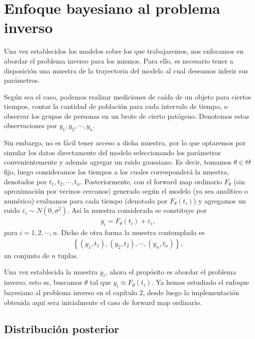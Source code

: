 \section{Enfoque bayesiano al problema inverso}

Una vez establecidos los modelos sobre los que trabajaremos, nos enfocamos en abordar el problema inverso para los mismos. Para ello, es necesario tener a disposición una muestra de la trayectoria del modelo al cual deseamos inferir sus parámetros.

Según sea el caso, podemos realizar mediciones de caída de un objeto para ciertos tiempos, contar la cantidad de población para cada intervalo de tiempo, o observar los grupos de personas en un brote de cierto patógeno. Denotemos estas observaciones por $y_1, y_2, \cdots, y_n$. 

Sin embargo, no es fácil tener acceso a dicha muestra, por lo que optaremos por simular los datos directamente del modelo seleccionando los parámetros convenientemente y además agregar un ruido gaussiano. Es decir, tomamos $\theta \in \Theta$ fijo, luego consideramos los tiempos a los cuales corresponderá la muestra, denotados por $t_1, t_2, \cdots, t_n$. Posteriormente, con el forward map ordinario $F_{\theta}$ (sin aproximación por vecinos cercanos) generado según el modelo (ya sea analítico o numérico) evaluamos para cada tiempo (denotado por $F_{\theta}(t_i)$) y agregamos un ruido $\varepsilon_i \sim N(0,\sigma^2)$. Así la muestra considerada se constituye por
\begin{align}
    y_i = F_{\theta}(t_i) + \varepsilon_i,%
    \label{3.2.01}
\end{align}
para $i = 1,2, \cdots, n$. Dicho de otra forma la muestra contemplada es
\begin{align}
    \left \{ (y_1,t_1), (y_2, t_2), \cdots, (y_n, t_n)\right \},
\end{align}
un conjunto de $n$ tuplas.


Una vez establecida la muestra $y_i$, ahora el propósito es abordar el problema inverso, esto es, buscamos $\theta$ tal que $y_i \approx F_{\theta}(t_i)$. Ya hemos estudiado el enfoque bayesiano al problema inverso en el capítulo 2, desde luego la implementación obtenida aquí sera inicialmente el caso de forward map ordinario.

\subsection{Distribución posterior}


